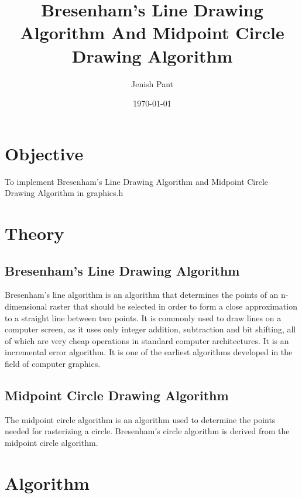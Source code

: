 \documentclass[12pt]{article}
\begin{document}
	
	\title{Bresenham's Line Drawing Algorithm And Midpoint Circle Drawing Algorithm}
	\author{Jenish Pant}
	\date{\today}
	\maketitle

	\section{Objective}
	To implement Bresenham's Line Drawing Algorithm and Midpoint Circle Drawing Algorithm in graphics.h
	\section{Theory}
	\subsection{Bresenham's Line Drawing Algorithm}
	Bresenham's line algorithm is an algorithm that determines the points of an n-dimensional raster that should be selected in order to form a close approximation to a straight line between two points. It is commonly used to draw lines on a computer screen, as it uses only integer addition, subtraction and bit shifting, all of which are very cheap operations in standard computer architectures. It is an incremental error algorithm. It is one of the earliest algorithms developed in the field of computer graphics.\\
	\subsection{Midpoint Circle Drawing Algorithm}
	The midpoint circle algorithm is an algorithm used to determine the points needed for rasterizing a circle. Bresenham's circle algorithm is derived from the midpoint circle algorithm.\\

	\section{Algorithm}
\end{document}
